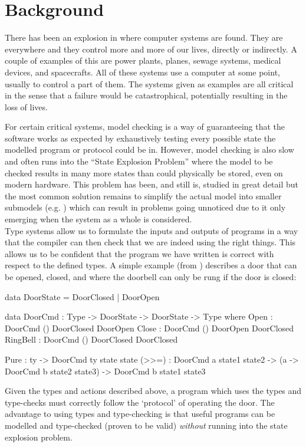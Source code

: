 \documentclass[11pt]{article}
\begin{document}
    \section*{Background}
    There has been an explosion in where computer systems are found. They are
    everywhere and they control more and more of our lives, directly or
    indirectly. A couple of examples of this are power plants, planes, sewage
    systems, medical devices, and spacecrafts. All of these systems use a
    computer at some point, usually to control a part of them. The systems
    given as examples are all critical in the sense that a failure would be
    catastrophical, potentially resulting in the loss of lives.
    
    For certain critical systems, model checking is a way of guaranteeing that
    the software works as expected by exhaustively testing every possible state
    the modelled program or protocol could be in. However, model checking is
    also slow and often runs into the ``State Explosion Problem''
    \cite{goos_state_1998} where the model to be checked results in many more
    states than could physically be stored, even on modern hardware. This
    problem has been, and still is, studied in great detail
    \cite{goos_progress_2001,stuart_simulation-verification_2001,demri_parametric_2006,clarke_model_2008,kress-gazit_correct_2011,meyer_model_2012}
    but the most common solution remains to simplify the actual model into
    smaller submodels (e.g. \cite{yan_sun_verifying_2007}) which can result in
    problems going unnoticed due to it only emerging when the system as a whole
    is considered.\\
    
    Type systems allow us to formulate the inputs and outputs of programs in a way that the compiler can then check that we are indeed using the right things. This allows us to be confident that the program we have written is correct with respect to the defined types. A simple example (from \cite{brady_type-driven_2017}) describes a door that can be opened, closed, and where the doorbell can only be rung if the door is closed:
    \begin{idrislisting}
data DoorState = DoorClosed | DoorOpen

data DoorCmd : Type -> DoorState -> DoorState -> Type
  where
    Open : DoorCmd     () DoorClosed DoorOpen
    Close : DoorCmd    () DoorOpen DoorClosed
    RingBell : DoorCmd () DoorClosed DoorClosed
    
    Pure : ty -> DoorCmd ty state state
    (>>=) : DoorCmd a state1 state2 ->
            (a -> DoorCmd b state2 state3) ->
            DoorCmd b state1 state3
    \end{idrislisting}
    Given the types and actions described above, a program which uses the types
    and type-checks must correctly follow the `protocol' of operating the door.
    The advantage to using types and type-checking is that useful programs can
    be modelled and type-checked (proven to be valid) \textit{without}
    running into the state explosion problem.
    
\end{document}
